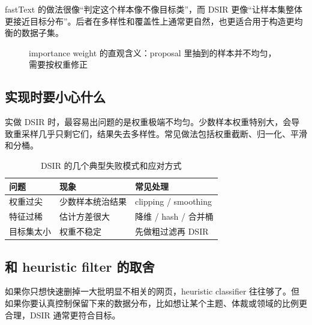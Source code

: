 \documentclass[a4paper]{article}
\begin{document}
fastText 的做法很像“判定这个样本像不像目标类”，而 DSIR 更像“让样本集整体更接近目标分布”。后者在多样性和覆盖性上通常更自然，也更适合用于构造更均衡的数据子集。

\begin{figure}[H]
\centering
{}
\caption{importance weight 的直观含义：proposal 里抽到的样本并不均匀，需要按权重修正}
\end{figure}

\subsection{实现时要小心什么}

实做 DSIR 时，最容易出问题的是权重极端不均匀。少数样本权重特别大，会导致重采样几乎只剩它们，结果失去多样性。常见做法包括权重截断、归一化、平滑和分桶。

\begin{table}[H]
\centering
\small
\renewcommand{\arraystretch}{1.15}
\begin{tabular}{p{3.0cm}p{4.2cm}p{4.2cm}}
\toprule
\textbf{问题} & \textbf{现象} & \textbf{常见处理} \\
\midrule
权重过尖 & 少数样本统治结果 & clipping / smoothing \\
特征过稀 & 估计方差很大 & 降维 / hash / 合并桶 \\
目标集太小 & 权重不稳定 & 先做粗过滤再 DSIR \\
\bottomrule
\end{tabular}
\caption{DSIR 的几个典型失败模式和应对方式}
\end{table}

\subsection{和 heuristic filter 的取舍}

如果你只想快速删掉一大批明显不相关的网页，heuristic classifier 往往够了。但如果你要认真控制保留下来的数据分布，比如想让某个主题、体裁或领域的比例更合理，DSIR 通常更符合目标。
\end{document}

